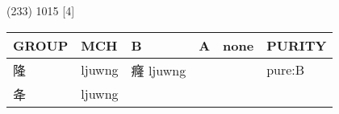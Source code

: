 \documentclass[14pt,a4paper]{scrartcl}
\begin{document}
(233) 1015 {[}4{]}

\begin{longtable}[c]{@{}llllll@{}}
\toprule
\begin{minipage}[b]{0.14\columnwidth}\raggedright\strut
GROUP
\strut\end{minipage} &
\begin{minipage}[b]{0.14\columnwidth}\raggedright\strut
MCH
\strut\end{minipage} &
\begin{minipage}[b]{0.14\columnwidth}\raggedright\strut
B
\strut\end{minipage} &
\begin{minipage}[b]{0.14\columnwidth}\raggedright\strut
A
\strut\end{minipage} &
\begin{minipage}[b]{0.14\columnwidth}\raggedright\strut
none
\strut\end{minipage} &
\begin{minipage}[b]{0.14\columnwidth}\raggedright\strut
PURITY
\strut\end{minipage}\tabularnewline
\midrule
\endhead
\begin{minipage}[t]{0.14\columnwidth}\raggedright\strut
隆
\strut\end{minipage} &
\begin{minipage}[t]{0.14\columnwidth}\raggedright\strut
ljuwng
\strut\end{minipage} &
\begin{minipage}[t]{0.14\columnwidth}\raggedright\strut
癃 ljuwng
\strut\end{minipage} &
\begin{minipage}[t]{0.14\columnwidth}\raggedright\strut
\strut\end{minipage} &
\begin{minipage}[t]{0.14\columnwidth}\raggedright\strut
\strut\end{minipage} &
\begin{minipage}[t]{0.14\columnwidth}\raggedright\strut
pure:B
\strut\end{minipage}\tabularnewline
\begin{minipage}[t]{0.14\columnwidth}\raggedright\strut
夅
\strut\end{minipage} &
\begin{minipage}[t]{0.14\columnwidth}\raggedright\strut
ljuwng
\strut\end{minipage} &
\begin{minipage}[t]{0.14\columnwidth}\raggedright\strut
\strut\end{minipage} &

\end{longtable}
\end{document}
